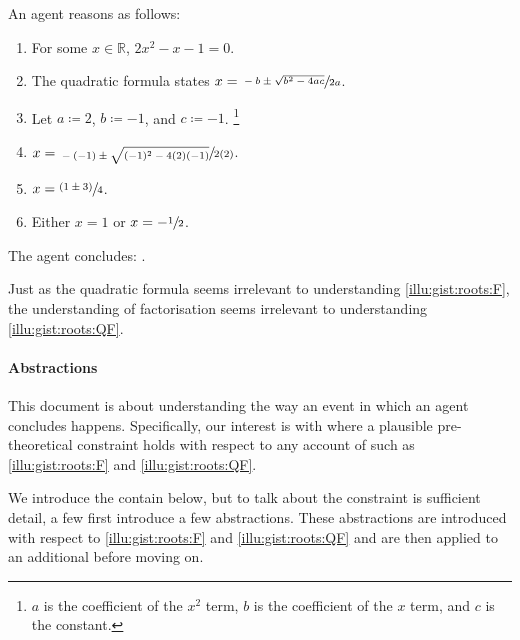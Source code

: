 \begin{note}
  \begin{scenario}%
    \label{illu:gist:roots:QF}%
    An agent reasons as follows:
    \begin{enumerate}[label=\arabic*., ref=\arabic*]
    \item
      \label{illu:gist:roots:QF:eq}
      For some \(x \in \mathbb{R}\), \(2x^{2} - x - 1 = 0\).
    \item
      \label{illu:gist:roots:QF:qf}
      The quadratic formula states \(x = \sfrac{-b \pm \sqrt{b^{2} - 4ac}}{2a}\).
    \item
      \label{illu:gist:roots:QF:subs}
      Let \(a \coloneq 2\), \(b \coloneq -1\), and \(c \coloneq -1\).%
      \footnote{
        \(a\) is the coefficient of the \(x^{2}\) term, \(b\) is the coefficient of the \(x\) term, and \(c\) is the constant.
      }
    \item
      \label{illu:gist:roots:QF:qf-subs}
      \(x = \sfrac{-(-1) \pm \sqrt{(-1)^{2} - 4(2)(-1)}}{2(2)}\).
    \item
      \label{illu:gist:roots:QF:qf:1}
      \(x = \sfrac{(1 \pm 3)}{4}\).
    \item
      \label{illu:gist:roots:QF:qf:done}
      Either \(x = 1\) or \(x = -\sfrac{1}{2}\).
    \end{enumerate}
    The agent concludes:
    \rootsCon{}.
  \end{scenario}

  \noindent%
  Just as the quadratic formula seems irrelevant to understanding \autoref{illu:gist:roots:F}, the \agents{} understanding of factorisation seems irrelevant to understanding \autoref{illu:gist:roots:QF}.
\end{note}



\paragraph*{Abstractions}


\begin{note}
  This document is about understanding the way an event in which an agent concludes happens.
  Specifically, our interest is with where a plausible pre-theoretical constraint holds with respect to any account of  such as \autoref{illu:gist:roots:F} and \autoref{illu:gist:roots:QF}.

  We introduce the contain below, but to talk about the constraint is sufficient detail, a few first introduce a few abstractions.
  These abstractions are introduced with respect to  \ref{illu:gist:roots:F} and \ref{illu:gist:roots:QF} and are then applied to an additional \scen{} before moving on.
\end{note}


